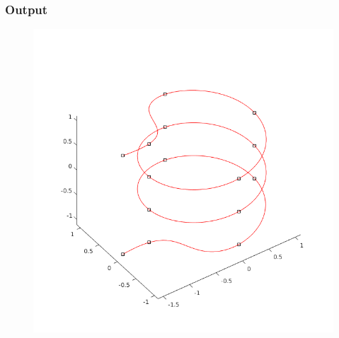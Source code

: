 \documentclass[ngerman,12pt]{article}
\begin{document}
\subsubsection*{Output}
\begin{figure}[H]
    \includegraphics[width=0.88\linewidth]{m5.png}
\end{figure}
\end{document}
